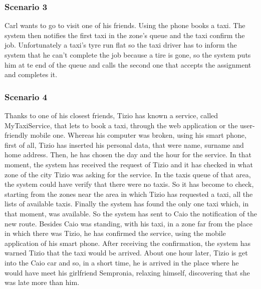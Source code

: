 		\subsubsection{Scenario 3}
		Carl wants to go to visit one of his friends. Using the phone books a taxi. The system then notifies the first taxi in the zone's queue and the taxi confirm the job. Unfortunately a taxi's tyre run flat so the taxi driver has to inform the system that he can't complete the job because a tire is gone, so the system puts him at te end of the queue and calls the second one that accepts the assignment and completes it.
		
		\subsubsection{Scenario 4}
		Thanks to one of his closest friends, Tizio has known a service, called MyTaxiService, that lets to book a taxi, through the web application or the user-friendly mobile one.
		Whereas his computer was broken, using his smart phone, first of all, Tizio has inserted his personal data, that were name, surname and home address. Then, he has chosen the day and the hour for the service. In that moment, the system has received the request of Tizio and it has checked in what zone of the city Tizio was asking for the service. In the taxis queue of that area, the system could have verify that there were no taxis. So it has become to check, starting from the zones near the area in which Tizio has requested a taxi, all the lists of available taxis. 
		Finally the system has found the only one taxi which, in that moment, was available. So the system has sent to Caio the notification of the new route. Besides Caio was standing, with his taxi, in a zone far from the place in which there was Tizio, he has confirmed the service, using the mobile application of his smart phone. After receiving the confirmation, the system has warned Tizio that the taxi would be arrived.
		About one hour later, Tizio is get into the Caio car and so, in a short time, he is arrived in the place where he would have meet his girlfriend Sempronia, relaxing himself, discovering that she was late more than him.

